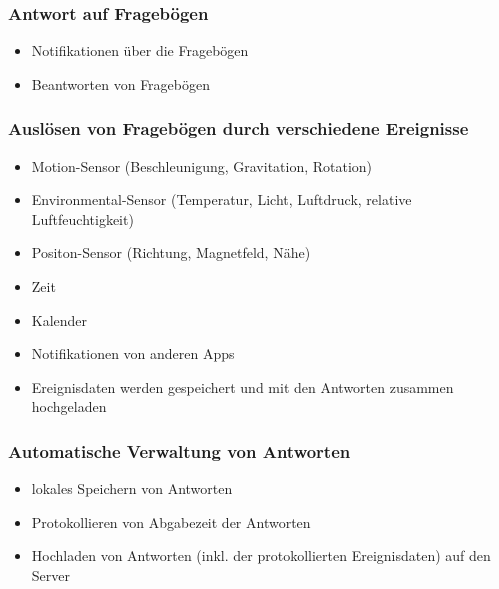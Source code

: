\documentclass[a4paper]{scrreprt}
\begin{document}
                \subsubsection{Antwort auf Frageb\"ogen}
                    \begin{itemize}
                        \item Notifikationen über die Fragebögen
                        \item Beantworten von Frageb\"ogen
                    \end{itemize}

                \subsubsection{Auslösen von Fragebögen durch verschiedene Ereignisse}
                    \begin{itemize}
                        \item Motion-Sensor (Beschleunigung, Gravitation, Rotation)
                        \item Environmental-Sensor (Temperatur, Licht, Luftdruck, relative Luftfeuchtigkeit)
                        \item Positon-Sensor (Richtung, Magnetfeld, Nähe)
                        \item Zeit
                        \item Kalender
                        \item Notifikationen von anderen Apps
                        \item Ereignisdaten werden gespeichert und mit den Antworten zusammen hochgeladen
                    \end{itemize}

                \subsubsection{Automatische Verwaltung von Antworten}
                    \begin{itemize}
                        \item lokales Speichern von Antworten
                        \item Protokollieren von Abgabezeit der Antworten
                        \item Hochladen von Antworten (inkl. der protokollierten Ereignisdaten) auf den Server
                    \end{itemize}
\end{document}
